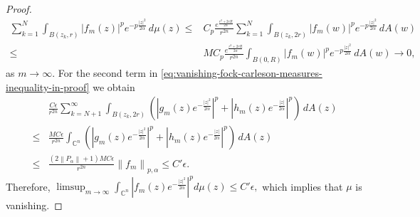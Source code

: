 \documentclass[10pt,leqno]{amsart}
\theoremstyle{remark}
\numberwithin{equation}{section}
\newcommand{\ph}{\mathcal{PH}_\alpha^p(\mathbb{C}^n)}%
\begin{document}
\begin{proof}
\begin{align*}
		\sum_{k=1}^{N}  \int_{B(z_k,r)}^{}|f_m(z)|^p e^{-p\frac{|z|^2}{2\alpha}}\, d\mu(z) \leq & C_p \frac{e^{\frac{r^2+2rR}{2\alpha}}}{r^{2n}} \sum_{k=1}^{N} \int_{B(z_k,2r)}^{} |f_m(w)|^p e^{-p \frac{|z|^2}{2\alpha}}\, dA(w) \\
		\leq                                                                                    & M C_p \frac{e^{\frac{r^2+2rR}{2\alpha}}}{r^{2n}} \int_{B(0,R)}^{} |f_m(w)|^p e^{-p \frac{|z|^2}{2\alpha}}\, dA(w) \to 0,
	\end{align*}
	as $m \to \infty.$ For the second term in \eqref{eq:vanishing-fock-carleson-measures-inequality-in-proof} we obtain
	\begin{align*}
		     & \frac{C \epsilon}{r^{2n}} \sum_{k=N+1}^{\infty} \int_{B(z_k,2r)}^{}\left( \left| g_m(z) e^{-\frac{|z|^2}{2\alpha}} \right| ^{p}+\left| h_m(z) e^{-\frac{|z|}{2\alpha}} \right| ^{p} \right) \, dA(z) \\
		\leq & \frac{MC \epsilon}{r^{2n}} \int_{\mathbb{C}^{n}}^{}\left( \left| g_m(z) e^{-\frac{|z|^2}{2\alpha}} \right| ^{p}+\left| h_m(z) e^{-\frac{|z|}{2\alpha}} \right| ^{p} \right) \, dA(z)                 \\
		\leq & \frac{(2 \left\lVert P_\alpha \right\rVert +1) MC \epsilon}{r^{2n}} \left\lVert f_m \right\rVert_{p,\alpha} \leq  C' \epsilon.
	\end{align*}
	Therefore, $\limsup_{m \to \infty} \int_{\mathbb{C}^{n}}^{} \left| f_m(z)e^{-\frac{|z|^2}{2\alpha}} \right| ^{p}d\mu(z) \leq C' \epsilon,$ which implies that $\mu$ is vanishing. %

\end{proof}
\end{document}
